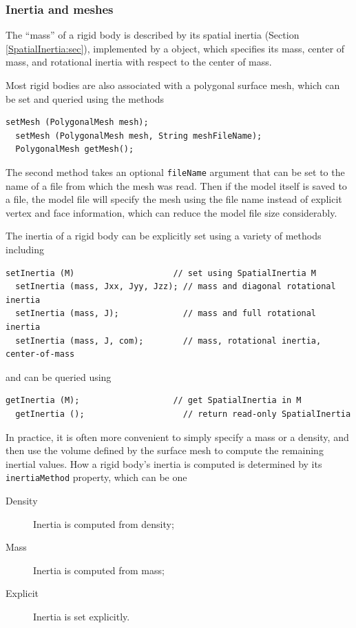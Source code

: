 \subsubsection{Inertia and meshes}

The ``mass'' of a rigid body is described by its spatial inertia
(Section \ref{SpatialInertia:sec}), implemented by a
 object, which
specifies its mass, center of mass, and rotational inertia with
respect to the center of mass.

Most rigid bodies are also associated with a polygonal surface mesh,
which can be set and queried using the methods
%
\begin{lstlisting}[]
  setMesh (PolygonalMesh mesh);
  setMesh (PolygonalMesh mesh, String meshFileName);
  PolygonalMesh getMesh();
\end{lstlisting}
%
The second method takes an optional {\tt fileName} argument that can
be set to the name of a file from which the mesh was read. Then if the
model itself is saved to a file, the model file will specify the mesh
using the file name instead of explicit vertex and face information,
which can reduce the model file size considerably.

The inertia of a rigid body can be explicitly set using a variety
of methods including
%
\begin{lstlisting}[]
  setInertia (M)                    // set using SpatialInertia M
  setInertia (mass, Jxx, Jyy, Jzz); // mass and diagonal rotational inertia
  setInertia (mass, J);             // mass and full rotational inertia
  setInertia (mass, J, com);        // mass, rotational inertia, center-of-mass
\end{lstlisting}
%
and can be queried using 
%
\begin{lstlisting}[]
  getInertia (M);                   // get SpatialInertia in M
  getInertia ();                    // return read-only SpatialInertia
\end{lstlisting}
%

In practice, it is often more convenient to simply specify a mass or a
density, and then use the volume defined by the surface mesh to
compute the remaining inertial values. How a rigid body's inertia is
computed is determined by its {\tt inertiaMethod} property, which can
be one

\begin{description}

\item[Density]\mbox{}

Inertia is computed from density;

\item[Mass]\mbox{}

Inertia is computed from mass;

\item[Explicit]\mbox{}

Inertia is set explicitly.

\end{description}


